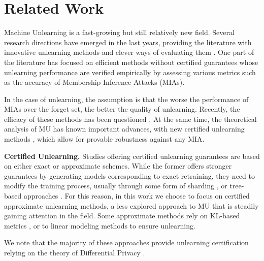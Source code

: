 \section{Related Work}
Machine Unlearning is a fast-growing but still relatively new field. Several research directions have emerged in the last years, providing the literature with innovative unlearning methods \cite{jin2023ntk, eldan2023harry_potter} %
and clever ways of evaluating them \cite{lynch2024eight, hong2024intrinsic}. 
One part of the literature has focused on efficient methods without certified guarantees  \cite{kurmanji2024towards_unbounded, eldan2023harry_potter} %
whose unlearning performance are verified empirically by assessing various metrics such as the accuracy of Membership Inference Attacks (MIAs).

In the case of unlearning, the assumption is that the worse the performance of MIAs over the forget set, the better the quality of unlearning. Recently, the efficacy of these methods has been questioned \cite{aubinais2023fundamental, hayes2024false_sense}.
At the same time, the theoretical analysis of MU has known important advances, with new certified unlearning methods \cite{chourasia2023forget_unlearning, ullah2023adaptive, georgiev2024attribute}, which allow for provable robustness against any MIA. 

\textbf{Certified Unlearning.}
Studies offering certified unlearning guarantees are based on either exact or approximate schemes. While the former offers stronger guarantees by generating models corresponding to exact retraining, they need to modify the training process, usually through some form of sharding \cite{sisa, yan2022arcane, wang2023fedcsa}, or tree-based approaches \cite{ullah2021machine, ullah2023adaptive}.
For this reason, in this work we choose to focus on certified approximate unlearning methods,
a less explored approach to MU that is steadily gaining attention in the field. Some approximate methods rely on KL-based metrics \cite{Golatkar_2020_CVPR, jin2023ntk, georgiev2024attribute}, or  to linear modeling methods \cite{izzo2021approximate} to ensure unlearning.

We note that the majority of these approaches provide unlearning certification relying on the theory of Differential Privacy \cite{guo2020certified, DescentToDelete, gupta2021adaptive, chourasia2023forget_unlearning, allouah2024utility}.

